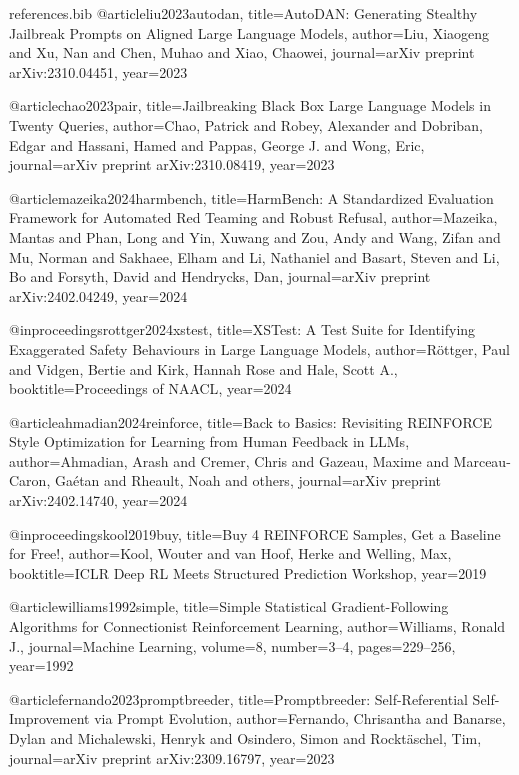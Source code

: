 \begin{filecontents*}{references.bib}
@article{liu2023autodan,
  title={{AutoDAN}: Generating Stealthy Jailbreak Prompts on Aligned Large Language Models},
  author={Liu, Xiaogeng and Xu, Nan and Chen, Muhao and Xiao, Chaowei},
  journal={arXiv preprint arXiv:2310.04451},
  year={2023}
}

@article{chao2023pair,
  title={Jailbreaking Black Box Large Language Models in Twenty Queries},
  author={Chao, Patrick and Robey, Alexander and Dobriban, Edgar and Hassani, Hamed and Pappas, George J. and Wong, Eric},
  journal={arXiv preprint arXiv:2310.08419},
  year={2023}
}

@article{mazeika2024harmbench,
  title={{HarmBench}: A Standardized Evaluation Framework for Automated Red Teaming and Robust Refusal},
  author={Mazeika, Mantas and Phan, Long and Yin, Xuwang and Zou, Andy and Wang, Zifan and Mu, Norman and Sakhaee, Elham and Li, Nathaniel and Basart, Steven and Li, Bo and Forsyth, David and Hendrycks, Dan},
  journal={arXiv preprint arXiv:2402.04249},
  year={2024}
}

@inproceedings{rottger2024xstest,
  title={{XSTest}: A Test Suite for Identifying Exaggerated Safety Behaviours in Large Language Models},
  author={R{\"o}ttger, Paul and Vidgen, Bertie and Kirk, Hannah Rose and Hale, Scott A.},
  booktitle={Proceedings of NAACL},
  year={2024}
}

@article{ahmadian2024reinforce,
  title={Back to Basics: Revisiting REINFORCE Style Optimization for Learning from Human Feedback in LLMs},
  author={Ahmadian, Arash and Cremer, Chris and Gazeau, Maxime and Marceau-Caron, Ga{\'e}tan and Rheault, Noah and others},
  journal={arXiv preprint arXiv:2402.14740},
  year={2024}
}

@inproceedings{kool2019buy,
  title={Buy 4 REINFORCE Samples, Get a Baseline for Free!},
  author={Kool, Wouter and van Hoof, Herke and Welling, Max},
  booktitle={ICLR Deep RL Meets Structured Prediction Workshop},
  year={2019}
}

@article{williams1992simple,
  title={Simple Statistical Gradient-Following Algorithms for Connectionist Reinforcement Learning},
  author={Williams, Ronald J.},
  journal={Machine Learning},
  volume={8},
  number={3--4},
  pages={229--256},
  year={1992}
}

@article{fernando2023promptbreeder,
  title={Promptbreeder: Self-Referential Self-Improvement via Prompt Evolution},
  author={Fernando, Chrisantha and Banarse, Dylan and Michalewski, Henryk and Osindero, Simon and Rockt{\"a}schel, Tim},
  journal={arXiv preprint arXiv:2309.16797},
  year={2023}
}


\end{filecontents*}
